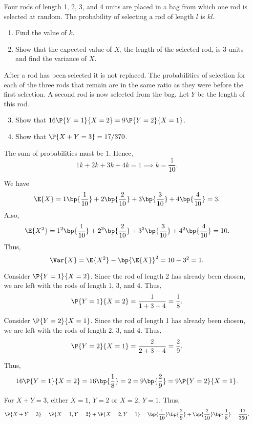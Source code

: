 \begin{problem}
    Four rods of length 1, 2, 3, and 4 units are placed in a bag from which one rod is selected at random. The probability of selecting a rod of length $l$ is $kl$.

    \begin{enumerate}
        \item Find the value of $k$.
        \item Show that the expected value of $X$, the length of the selected rod, is 3 units and find the variance of $X$.
    \end{enumerate}

    After a rod has been selected it is not replaced. The probabilities of selection for each of the three rods that remain are in the same ratio as they were before the first selection. A second rod is now selected from the bag. Let $Y$ be the length of this rod.
    \begin{enumerate}
        \setcounter{enumi}{2}
        \item Show that $16\P{Y = 1}{X = 2} = 9\P{Y = 2}{X = 1}$.
        \item Show that $\P{X + Y = 3} = 17/370$.
    \end{enumerate}
\end{problem}
\begin{solution}
    \begin{ppart}
        The sum of probabilities must be 1. Hence, \[1k + 2k + 3k + 4k = 1 \implies k = \frac1{10}.\]
    \end{ppart}
    \begin{ppart}
        We have \[\E{X} = 1\bp{\frac1{10}} + 2\bp{\frac2{10}} + 3\bp{\frac3{10}} + 4\bp{\frac4{10}} = 3.\] Also, \[\E{X^2} = 1^2\bp{\frac1{10}} + 2^2\bp{\frac2{10}} + 3^2\bp{\frac3{10}} + 4^2\bp{\frac4{10}} = 10.\] Thus, \[\Var{X} = \E{X^2} - \bp{\E{X}}^2 = 10 - 3^2 = 1.\]
    \end{ppart}
    \begin{ppart}
        Consider $\P{Y = 1}{X = 2}$. Since the rod of length 2 has already been chosen, we are left with the rods of length 1, 3, and 4. Thus, \[\P{Y = 1}{X = 2} = \frac1{1 + 3 + 4} = \frac18.\]

        Consider $\P{Y = 2}{X = 1}$. Since the rod of length 1 has already been chosen, we are left with the rods of length 2, 3, and 4. Thus, \[\P{Y = 2}{X = 1} = \frac{2}{2 + 3 + 4} = \frac29.\]

        Thus, \[16\P{Y = 1}{X = 2} = 16\bp{\frac{1}{8}} = 2 = 9\bp{\frac29} = 9\P{Y = 2}{X = 1}.\]
    \end{ppart}
    \begin{ppart}
        For $X + Y = 3$, either $X = 1$, $Y = 2$ or $X = 2$, $Y = 1$. Thus, \[\P{X + Y = 3} = \P{X = 1, Y=2} + \P{X = 2, Y=1} = \bp{\frac1{10}}\bp{\frac29} + \bp{\frac2{10}} \bp{\frac18} = \frac{17}{360}.\]
    \end{ppart}
\end{solution}

